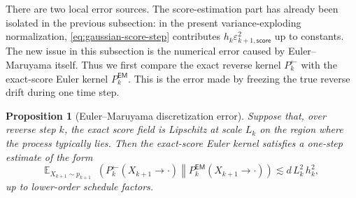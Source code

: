 \documentclass{amsart}
\numberwithin{equation}{section}
\theoremstyle{plain}
\newtheorem{prop}[theorem]{Proposition}
\theoremstyle{definition}
\theoremstyle{remark}
\DeclareMathOperator{\KL}{D_{\mathsf{KL}}}
\newcommand{\E}{\mathbb{E}}
\newcommand{\eps}{\varepsilon}
\begin{document}
There are two local error sources.  The score-estimation part has already been
isolated in the previous subsection: in the present variance-exploding
normalization, \eqref{eq:gaussian-score-step} contributes
$h_k\eps_{k+1,\mathsf{score}}^2$ up to constants.  The new issue in this
subsection is the numerical error caused by Euler--Maruyama itself.  Thus we
first compare the exact reverse kernel $P_k^{\leftarrow}$ with the exact-score
Euler kernel $P_k^{\mathsf{EM}}$.  This is the error made by freezing the true
reverse drift during one time step.

\begin{prop}[Euler--Maruyama discretization error]
\label{prop:em-local-error}
Suppose that, over reverse step $k$, the exact score field is Lipschitz at
scale $L_k$ on the region where the process typically lies.  Then the
exact-score Euler kernel satisfies a one-step estimate of the form
\[
    \E_{X_{k+1}\sim p_{k+1}}
    \KL\!\left(
        P_k^{\leftarrow}(X_{k+1} \to \cdot)
        \middle\|
        P_k^{\mathsf{EM}}(X_{k+1} \to \cdot)
    \right)
    \lesssim
    d\,L_k^2\,h_k^2,
\]
up to lower-order schedule factors.
\end{prop}
\end{document}
